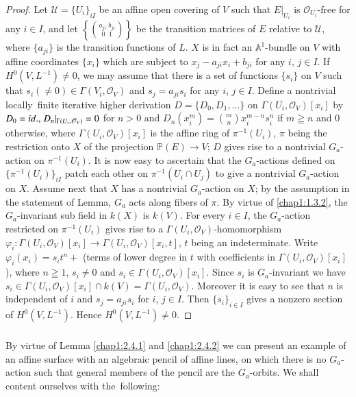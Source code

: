 \begin{proof}
Let $\mathscr{U}=\{U_{i}\}_{iI}$ be an affine open covering of $V$
such that $E|_{U_{i}}$ is $\mathscr{O}_{U_{i}}$-free for any $i\in I$,
and let $\left\{\binom{a_{ji}\; b_{ji}}{0\;\; 1}\right\}$ be the
transition matrices of $E$ relative to $\mathscr{U}$, where
$\{a_{ji}\}$ is the transition functions of $L$. $X$ is in fact an
$\mathbb{A}^{1}$-bundle on $V$ with affine coordinates $\{x_{i}\}$
which are subject to $x_{j}-a_{ji}x_{i}+b_{ji}$ for any $i$, $j\in
I$. If $H^{0}(V,L^{-1})\neq 0$, we may assume that there is a set of
functions $\{s_{i}\}$ on $V$ such that $s_{i}(\neq 0)\in
\Gamma(V_{i},\mathscr{O}_{V})$ and $s_{j}=a_{ji}s_{i}$ for any $i$,
$j\in I$. Define a nontrivial locally\pageoriginale\ finite iterative
higher derivation $D=\{D_{0},D_{1},\ldots\}$ on
$\Gamma(U_{i},\mathscr{O}_{V})[x_{i}]$ by $D_{0}={id.,}\kern.3em
D_{n}|_{\Gamma(U_{i},\mathscr{O}_{V})}=0$ for $n>0$ and
$D_{n}(x^{m}_{i})=\binom{m}{n}x^{m-n}_{i}s^{n}_{i}$ if $m\geqq n$ and
$0$ otherwise, where $\Gamma(U_{i},\mathscr{O}_{V})[x_{i}]$ is the
affine ring of $\pi^{-1}(U_{i})$, $\pi$ being the restriction onto $X$
of the projection $\mathbb{P}(E)\to V$; $D$ gives rise to a nontrivial
$G_{a}$-action on $\pi^{-1}(U_{i})$. It is now easy to ascertain that
the $G_{a}$-actions defined on $\{\pi^{-1}(U_{i})\}_{iI}$ patch each
other on $\pi^{-1}(U_{i}\cap U_{j})$ to give a nontrivial
$G_{a}$-action on $X$. Assume next that $X$ has a nontrivial
$G_{a}$-action on $X$; by the assumption in the statement of Lemma,
$G_{a}$ acts along fibers of $\pi$. By virtue of \ref{chap1:1.3.2}, the
$G_{a}$-invariant sub field in $k(X)$ is $k(V)$. For every $i\in I$,
the $G_{a}$-action restricted on $\pi^{-1}(U_{i})$ gives rise to a
$\Gamma(U_{i},\mathscr{O}_{V})$-homomorphism
$\varphi_{i}:\Gamma(U_{i},\mathscr{O}_{V})[x_{i}]\to
\Gamma(U_{i},\mathscr{O}_{V})[x_{i},t]$, $t$ being an
indeterminate. Write $\varphi_{i}(x_{i})=s_{i}t^{n}+$ (terms of lower
degree in $t$ with coefficients in
$\Gamma(U_{i},\mathscr{O}_{V})[x_{i}]$), where $n\geqq 1$, $s_{i}\neq
0$ and $s_{i}\in \Gamma(U_{i},\mathscr{O}_{V})[x_{i}]$. Since $s_{i}$
is $G_{a}$-invariant we have $s_{i}\in
\Gamma(U_{i},\mathscr{O}_{V})[x_{i}]\cap
k(V)=\Gamma(U_{i},\mathscr{O}_{V})$. Moreover it is easy to see that
$n$ is independent of $i$ and $s_{j}=a_{ji}s_{i}$ for $i$, $j\in
I$. Then $\{s_{i}\}_{i\in I}$ gives a nonzero section of
$H^{0}(V,L^{-1})$. Hence $H^{0}(V,L^{-1})\neq 0$.
\end{proof}

\subsubsection{}\label{chap1:2.4.3}
By virtue of Lemma \ref{chap1:2.4.1} and \ref{chap1:2.4.2} we can present an
example of an affine surface with an algebraic pencil of affine lines,
on which there is no $G_{a}$-action such that general members of the
pencil are the $G_{a}$-orbits. We shall content ourselves with
the\pageoriginale\ following:

